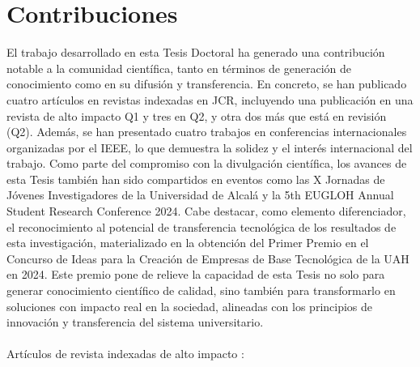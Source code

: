 \section{Contribuciones}

El trabajo desarrollado en esta Tesis Doctoral ha generado una contribución notable a la comunidad científica, tanto en términos de generación de conocimiento como en su difusión y transferencia. En concreto, se han publicado cuatro artículos en revistas indexadas en JCR, incluyendo una publicación en una revista de alto impacto Q1 y tres en Q2, y otra dos más que está en revisión (Q2). Además, se han presentado cuatro trabajos en conferencias internacionales organizadas por el IEEE, lo que demuestra la solidez y el interés internacional del trabajo. Como parte del compromiso con la divulgación científica, los avances de esta Tesis también han sido compartidos en eventos como las X Jornadas de Jóvenes Investigadores de la Universidad de Alcalá y la 5th EUGLOH Annual Student Research Conference 2024. Cabe destacar, como elemento diferenciador, el reconocimiento al potencial de transferencia tecnológica de los resultados de esta investigación, materializado en la obtención del Primer Premio en el Concurso de Ideas para la Creación de Empresas de Base Tecnológica de la UAH en 2024. Este premio pone de relieve la capacidad de esta Tesis no solo para generar conocimiento científico de calidad, sino también para transformarlo en soluciones con impacto real en la sociedad, alineadas con los principios de innovación y transferencia del sistema universitario.\\
\\
Artículos de revista indexadas de alto impacto :

